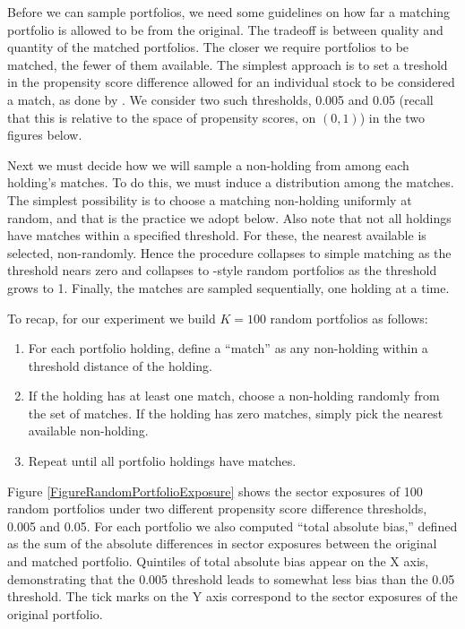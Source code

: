 \documentclass{article}\usepackage{graphicx, color}
\begin{document}
Before we can sample portfolios, we need some guidelines on how far a
matching portfolio is allowed to be from the original. The tradeoff is
between quality and quantity of the matched portfolios. The closer we
require portfolios to be matched, the fewer of them available. The
simplest approach is to set a treshold in the propensity score 
difference allowed for an individual stock to be considered a match,
as done by \cite{rosenbaum85}. We consider two such thresholds, 0.005
and 0.05 (recall that this is relative to the space of propensity scores, on
$(0,1)$) in the two figures below.

Next we must decide how we will sample a non-holding from among each
holding's matches. To do this, we must induce a distribution among the
matches. The simplest possibility is to choose a matching non-holding
uniformly at random, and that is the practice we adopt below. Also
note that not all holdings have matches within a specified threshold. For
these, the nearest available is selected, non-randomly. Hence the
procedure collapses to simple matching as the threshold nears zero and
collapses to \cite{burns04}-style random portfolios as the threshold
grows to 1. Finally, the matches are sampled sequentially,
one holding at a time.

To recap, for our experiment we build $K = 100$ random portfolios as follows:

\begin{enumerate}
\item For each portfolio holding, define a ``match'' as any
  non-holding within a threshold distance of the holding.
\item If the holding has at least one match, choose a
  non-holding randomly from the set of matches. If the holding has
  zero matches, simply pick the nearest available
  non-holding.
\item Repeat until all portfolio holdings have matches.
\end{enumerate}

Figure \ref{FigureRandomPortfolioExposure} shows the sector exposures
of 100 random portfolios under two different propensity score
difference thresholds, 0.005 and 0.05. For each portfolio we also
computed ``total absolute bias,'' defined as the sum of the absolute
differences in sector exposures between the original and matched
portfolio. Quintiles of total absolute bias appear on the X axis,
demonstrating that the 0.005
threshold leads to somewhat less bias than the 0.05 threshold. The
tick marks on the Y axis correspond to the sector exposures of the
original portfolio.
\end{document}
